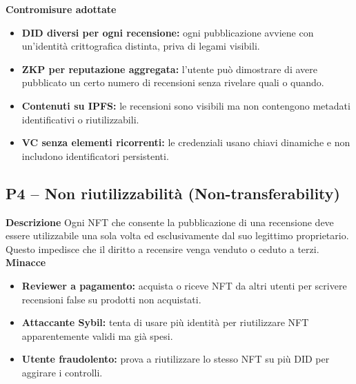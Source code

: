             \noindent \textbf{Contromisure adottate}
                \begin{itemize}
                    \item \textbf{DID diversi per ogni recensione:} ogni pubblicazione avviene con un'identità crittografica distinta, priva di legami visibili.

                    \item \textbf{ZKP per reputazione aggregata:} l'utente può dimostrare di avere pubblicato un certo numero di recensioni senza rivelare quali o quando.

                    \item \textbf{Contenuti su IPFS:} le recensioni sono visibili ma non contengono metadati identificativi o riutilizzabili.

                    \item \textbf{VC senza elementi ricorrenti:} le credenziali usano chiavi dinamiche e non includono identificatori persistenti.
                \end{itemize}

        \subsection{P4 – Non riutilizzabilità (Non-transferability)}
            \noindent \textbf{Descrizione}
                Ogni NFT che consente la pubblicazione di una recensione deve essere utilizzabile una sola volta ed esclusivamente dal suo legittimo proprietario. Questo impedisce che il diritto a recensire venga venduto o ceduto a terzi. \\

            \noindent \textbf{Minacce}
                \begin{itemize}
                    \item \textbf{Reviewer a pagamento:} acquista o riceve NFT da altri utenti per scrivere recensioni false su prodotti non acquistati.

                    \item \textbf{Attaccante Sybil:} tenta di usare più identità per riutilizzare NFT apparentemente validi ma già spesi.

                    \item \textbf{Utente fraudolento:} prova a riutilizzare lo stesso NFT su più DID per aggirare i controlli.
                \end{itemize}

